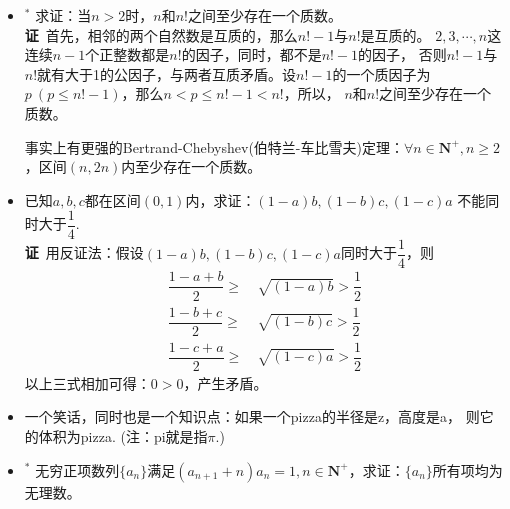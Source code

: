 \begin{itemize}[leftmargin=\inteval{\myitemleftmargin}pt,itemsep=
   \inteval{\myitemitempsep}pt,topsep=\inteval{\myitemtopsep}pt]
\item $ ^* $ 求证：当$ n>2 $时，$ n $和$ n! $之间至少存在一个质数。\\
\textbf{证}\ 首先，相邻的两个自然数是互质的，那么$ n!-1 $与$ n! $是互质的。
$ 2,3,\cdots,n $这连续$ n-1 $个正整数都是$ n! $的因子，同时，都不是$ n!-1 $的因子，
否则$ n!-1 $与$ n! $就有大于1的公因子，与两者互质矛盾。设$ n!-1 $的一个质因子为
$ p\ (p\leq n!-1) $，那么$ n<p\leq n!-1<n! $，所以，
$ n $和$ n! $之间至少存在一个质数。

事实上有更强的Bertrand-Chebyshev(伯特兰-车比雪夫)定理：$ \forall n\in \textbf{N}^+,n\geq 2 $，区间$ (n,2n) $内至少存在一个质数。

\item 已知$ a,b,c $都在区间$ (0,1) $内，求证：$ (1-a)b,(1-b)c,(1-c)a $
不能同时大于$ \dfrac{1}{4} $.  \\
\textbf{证}\ 用反证法：假设$ (1-a)b,(1-b)c,(1-c)a $同时大于$ \dfrac{1}{4} $，则
\begin{align*}
    \dfrac{1-a+b}{2} \geq &\ \sqrt{(1-a)b}>\dfrac{1}{2} \\
    \dfrac{1-b+c}{2} \geq &\ \sqrt{(1-b)c}>\dfrac{1}{2} \\
    \dfrac{1-c+a}{2} \geq &\ \sqrt{(1-c)a}>\dfrac{1}{2}      
\end{align*}
以上三式相加可得：$ 0>0 $，产生矛盾。 

\item  一个笑话，同时也是一个知识点：如果一个pizza的半径是z，高度是a，
则它的体积为pizza. (注：pi就是指$ \pi $.)

\item $ ^* $ 无穷正项数列$ \{a_n\} $满足$ (a_{n+1}+n)a_n=1,n\in 
\textbf{N}^+ $，求证：$ \{a_n\} $所有项均为无理数。

\end{itemize}

